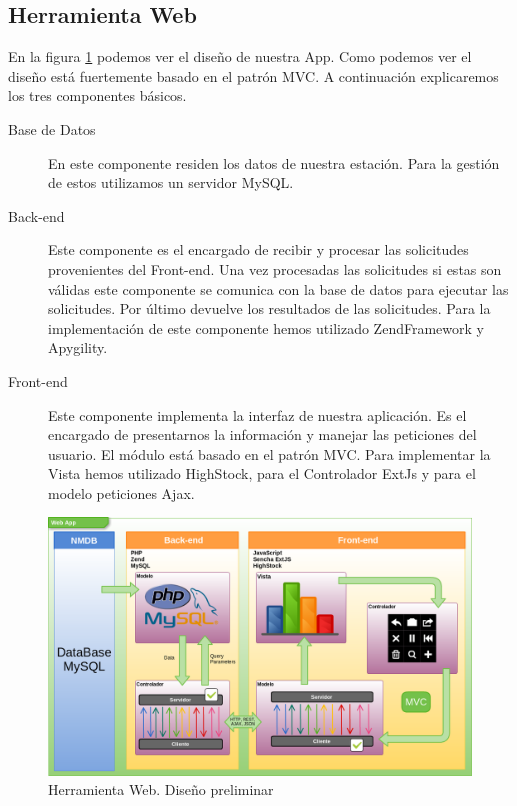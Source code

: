 	\subsection{Herramienta Web}
		En la figura \ref{fig:herramienta_web_preliminar} podemos ver el diseño de nuestra App. Como podemos ver el diseño está fuertemente basado en el patrón
		MVC\cite{MVCWiki}. A continuación explicaremos los tres componentes básicos. 
		\begin{description}
			\item[Base de Datos]    En este componente residen los datos de nuestra estación. Para la gestión de estos utilizamos un servidor MySQL.
			\item[Back-end]    	Este componente es el encargado de recibir y procesar las solicitudes provenientes del Front-end. Una vez procesadas
			  			las solicitudes si estas son válidas este componente se comunica con la base de datos para ejecutar las solicitudes. 
						Por último devuelve los resultados de las solicitudes. Para la implementación de este componente hemos utilizado
						ZendFramework y Apygility.  
			\item[Front-end]    	Este componente implementa la interfaz de nuestra aplicación. Es el encargado de presentarnos la información y
			  			manejar las peticiones del usuario. El módulo está basado en el patrón MVC. Para implementar la Vista hemos
						utilizado HighStock, para el Controlador ExtJs y para el modelo peticiones Ajax.
		\end{description}
		\begin{figure}[h]
			\centering
			\includegraphics[keepaspectratio, width=1\textwidth]{./img/herramienta_web_preliminar.png}
			\caption{Herramienta Web. Diseño preliminar}
			\label{fig:herramienta_web_preliminar}
		\end{figure}
